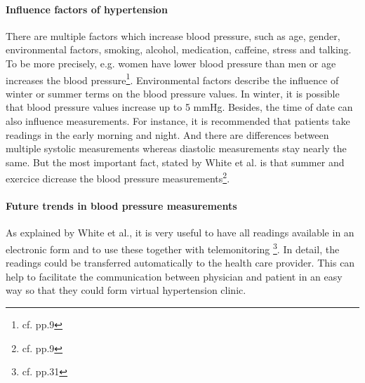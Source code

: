 \paragraph{Influence factors of hypertension}
There are multiple factors which increase blood pressure, such as age, gender, environmental factors, smoking, alcohol, medication, caffeine, stress and talking.
To be more precisely, e.g. women have lower blood pressure than men or age increases the blood pressure\footnote{cf.\autocite{white_blood_2007} pp.9}. Environmental factors describe the influence of winter or summer terms on the blood pressure values. In winter, it is possible that blood pressure values increase up to 5 mmHg. Besides, the time of date can also influence measurements. For instance, it is recommended that patients take readings in the early morning and night. And there are differences between multiple systolic measurements whereas diastolic measurements stay nearly the same. But the most important fact, stated by White et al. is that summer and exercice dicrease the blood pressure measurements\footnote{cf.\autocite{white_blood_2007} pp.9}.

\paragraph{Future trends in blood pressure measurements}
As explained by White et al., it is very useful to have all readings available in an electronic form and to use these together with telemonitoring \footnote{cf.\autocite{white_blood_2007} pp.31}. In detail, the readings could be transferred automatically to the health care provider. This can help to facilitate the communication between physician and patient in an easy way so that they could form virtual hypertension clinic.

